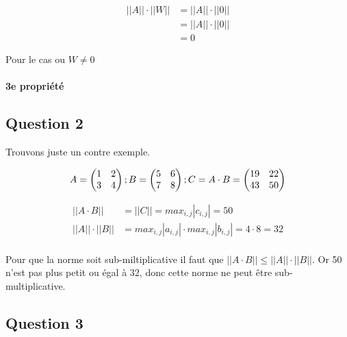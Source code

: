 \begin{equation}
	\begin{aligned}
		||A|| \cdot ||W|| &= ||A|| \cdot ||0||\\
		&= ||A|| \cdot ||0||\\
		&= 0
	\end{aligned}
\end{equation}

Pour le cas ou $W \neq 0$ 

\paragraph{3e propriété}

\subsection{Question 2}

Trouvons juste un contre exemple.

\begin{equation}
	A = 
	\begin{pmatrix}
		1 & 2\\
		3 & 4
	\end{pmatrix};\\
	B = 
	\begin{pmatrix}
		5 & 6\\
		7 & 8
	\end{pmatrix};\\
	C = A \cdot B = 
	\begin{pmatrix}
		19 & 22\\
		43 & 50
	\end{pmatrix}
\end{equation}

\begin{equation}
	\begin{aligned}
		||A \cdot B|| &= ||C|| = max_{i,j}|c_{i,j}| = 50\\
		||A|| \cdot ||B|| &= max_{i,j}|a_{i,j}| \cdot max_{i,j}|b_{i,j}| = 4 \cdot 8 = 32\\
	\end{aligned}
\end{equation}

Pour que la norme soit sub-miltiplicative il faut que $||A \cdot B|| \leq ||A|| \cdot ||B||$. Or 50 n'est pas plus petit ou égal à 32, donc cette norme ne peut être sub-multiplicative.

\subsection{Question 3}

